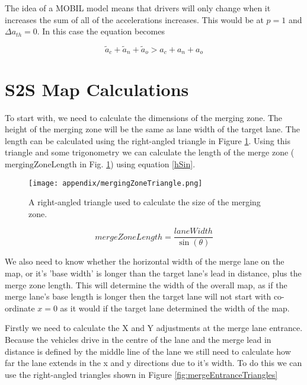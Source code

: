 \begin{appendices}
The idea of a MOBIL model means that drivers will only change when it increases the sum of all of the accelerations increases. This would be at $p = 1$ and $\Delta a_{th} = 0$. In this case the equation becomes 

\begin{equation}
\tilde{a}_c + \tilde{a}_n + \tilde{a}_o > a_c + a_n + a_o 
\end{equation}


\section{S2S Map Calculations}
\label{sec:S2SMapCalculations}
To start with, we need to calculate the dimensions of the merging zone. The height of the merging zone will be the same as lane width of the target lane. The length can be calculated using the right-angled triangle in Figure \ref{fig:mergingZoneTriangle}. Using this triangle and some trigonometry we can calculate the length of the merge zone ($\text{mergingZoneLength}$ in Fig. \ref{fig:mergingZoneTriangle}) using equation \ref{hSin}.

\begin{figure}[htb]
\centering
\texttt{[image: appendix/mergingZoneTriangle.png]}
\caption{A right-angled triangle used to calculate the size of the merging zone.}
\label{fig:mergingZoneTriangle}
\end{figure}

\begin{equation}\label{hSin}
mergeZoneLength = \frac{laneWidth}{\sin(\theta)}
\end{equation}

We also need to know whether the horizontal width of the merge lane on the map, or it's 'base width' is longer than the target lane's lead in distance, plus the merge zone length. This will determine the width of the overall map, as if the merge lane's base length is longer then the target lane will not start with co-ordinate $x=0$ as it would if the target lane determined the width of the map.

Firstly we need to calculate the X and Y adjustments at the merge lane entrance. Because the vehicles drive in the centre of the lane and the merge lead in distance is defined by the middle line of the lane we still need to calculate how far the lane extends in the x and y directions due to it's width. To do this we can use the right-angled triangles shown in Figure \ref{fig:mergeEntranceTriangles}


\end{appendices}
